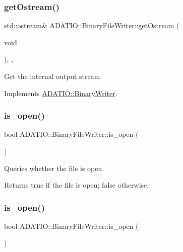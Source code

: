 \subsubsection{\texorpdfstring{getOstream()}{getOstream()}\hspace{0.1cm}{\footnotesize\ttfamily [2/2]}}
{\footnotesize\ttfamily std\+::ostream\& A\+D\+A\+T\+I\+O\+::\+Binary\+File\+Writer\+::get\+Ostream (\begin{DoxyParamCaption}\item[{void}]{ }\end{DoxyParamCaption})\hspace{0.3cm}{\ttfamily [inline]}, {\ttfamily [protected]}, {\ttfamily [virtual]}}



Get the internal output stream. 



Implements \mbox{\hyperlink{classADATIO_1_1BinaryWriter_a4fe227341d17d012bb83a070c208dac0}{A\+D\+A\+T\+I\+O\+::\+Binary\+Writer}}.

\mbox{\label{classADATIO_1_1BinaryFileWriter_a891f81b41b18e3ba86c7e8af134b603e}} 
\subsubsection{\texorpdfstring{is\_open()}{is\_open()}\hspace{0.1cm}{\footnotesize\ttfamily [1/2]}}
{\footnotesize\ttfamily bool A\+D\+A\+T\+I\+O\+::\+Binary\+File\+Writer\+::is\+\_\+open (\begin{DoxyParamCaption}{ }\end{DoxyParamCaption})}



Queries whether the file is open. 

\begin{DoxyReturn}{Returns}
true if the file is open; false otherwise. 
\end{DoxyReturn}
\mbox{\label{classADATIO_1_1BinaryFileWriter_a891f81b41b18e3ba86c7e8af134b603e}} 
\subsubsection{\texorpdfstring{is\_open()}{is\_open()}\hspace{0.1cm}{\footnotesize\ttfamily [2/2]}}
{\footnotesize\ttfamily bool A\+D\+A\+T\+I\+O\+::\+Binary\+File\+Writer\+::is\+\_\+open (\begin{DoxyParamCaption}{ }\end{DoxyParamCaption})}




